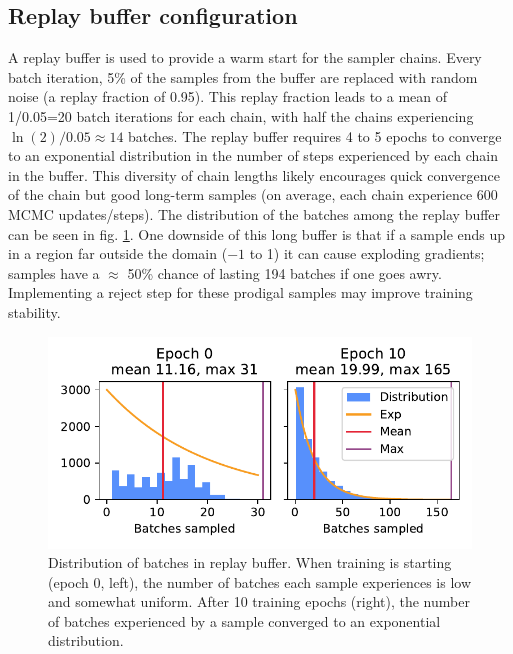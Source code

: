 \subsection{Replay buffer configuration}
A replay buffer is used to provide a warm start for the sampler chains. Every batch iteration, 5\% of the samples from the buffer are replaced with random noise (a replay fraction of 0.95). This replay fraction leads to a mean of 1/0.05=20 batch iterations for each chain, with half the chains experiencing $\ln(2)/0.05 \approx 14$ batches. The replay buffer requires 4 to 5 epochs to converge to an exponential distribution in the number of steps experienced by each chain in the buffer. This diversity of chain lengths likely encourages quick convergence of the chain but good long-term samples (on average, each chain experience 600 MCMC updates/steps). The distribution of the batches among the replay buffer can be seen in fig. \ref{fig:buffer_distribution}. One downside of this long buffer is that if a sample ends up in a region far outside the domain ($-1$ to 1) it can cause exploding gradients; samples have a $\approx$ 50\% chance of lasting 194 batches if one goes awry. Implementing a reject step for these prodigal samples may improve training stability. 

\begin{figure}
	\centering
	\includegraphics[width=350pt]{figures/buffer_distributions.pdf}
	\caption[Distribution of batches in replay buffer samples]{\label{fig:buffer_distribution}Distribution of batches in replay buffer. When training is starting (epoch 0, left), the number of batches each sample experiences is low and somewhat uniform. After 10 training epochs (right), the number of batches experienced by a sample converged to an exponential distribution.}
\end{figure}

